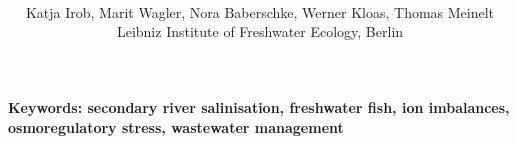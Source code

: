 \documentclass[twoside]{article}
\title{\vspace{-15mm}\fontsize{22pt}{11pt}\selectfont\textbf{\labtitle}} %
\author{
\large
\textsc{\names}\\[2mm] Katja Irob, Marit Wagler, Nora Baberschke, Werner Kloas, Thomas Meinelt \\
\normalsize  Leibniz Institute of Freshwater Ecology, Berlin %
}
\begin{document}
\maketitle %

\thispagestyle{fancy} %

\begin{abstract}

\end{abstract}

\textbf{Keywords: secondary river salinisation, freshwater fish, ion imbalances, osmoregulatory stress, wastewater management}


\end{document}
